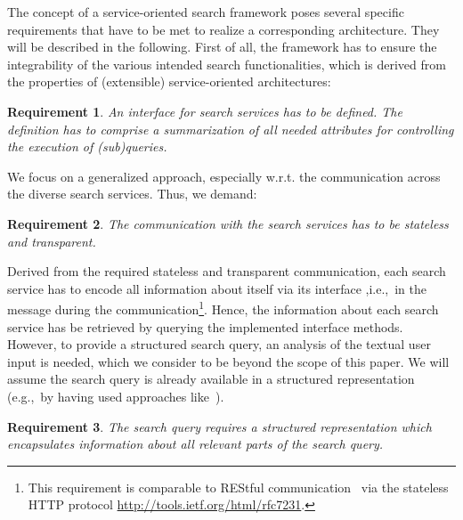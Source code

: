 \documentclass{acm_proc_article-sp}
\newtheorem{req}{Requirement}
\newcommand{\eg}{e.g.,~}
\newcommand{\ie}{i.e.,~}
\begin{document}
The concept of a service-oriented search framework poses several specific requirements that have to be met to rea\-lize a corresponding architecture.
They will be described in the following.
First of all, the framework has to ensure the integrability of the various intended search functionalities, which is derived from the properties of (extensible) service-oriented architectures:
\begin{req}
An interface for search services has to be defined. The definition has to comprise a  summarization of all needed attributes for controlling the execution of (sub)queries.
\end{req}

We focus on a generalized approach, especially w.r.t. the communication across the diverse search services. Thus, we demand:
\begin{req}
The communication with the search services has to be stateless and transparent.
\end{req}
Derived from the required stateless and transparent communication, each search service has to encode all information about itself via its interface ,\ie in the message during the communication\footnote{This requirement is comparable to REStful communication~\cite{richardson2008restful} via the stateless HTTP protocol \url{http://tools.ietf.org/html/rfc7231}.}.
Hence, the information about each search service has be retrieved by querying the implemented interface methods.
However, to provide a structured search query, an analysis of the textual user input is needed, which we consider to be beyond the scope of this paper. 
We will assume the search query is already available in a structured representation (\eg by having used approaches like~\cite{similarity,aqualog,tbsl}).
\begin{req}
The search query requires a structured representation which encapsulates information about all re\-le\-vant parts of the search query.
\label{req:allrelevantparts}
\end{req}
\end{document}
